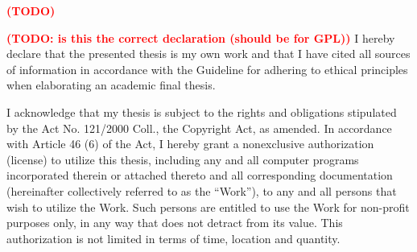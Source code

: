\documentclass[english,master,twoside]{ctufit-thesis}
\newcommand{\todo}[1]{\textbf{\textcolor{red}{(TODO: #1)}}}
\newcommand{\todoadd}[0]{\textbf{\textcolor{red}{(TODO)}}}
\begin{document}
\frontmatter\frontmatterinit %

\thispagestyle{empty}\maketitle\thispagestyle{empty}\cleardoublepage %



\imprintpage %
\stopTOCentries

\begin{acknowledgmentpage}
	\todoadd
\end{acknowledgmentpage}


\begin{declarationpage}
	\todo{is this the correct declaration (should be for GPL)}
	I hereby declare that the presented thesis is my own work and that I have cited all
	sources of information in accordance with the Guideline for adhering to ethical
	principles when elaborating an academic final thesis.

	I acknowledge that my thesis is subject to the rights and obligations stipulated by the
	Act No. 121/2000 Coll., the Copyright Act, as amended. In accordance with Article 46 (6)
	of the Act, I hereby grant a nonexclusive authorization (license) to utilize this thesis,
	including any and all computer programs incorporated therein or attached thereto and
	all corresponding documentation (hereinafter collectively referred to as the “Work”), to
	any and all persons that wish to utilize the Work. Such persons are entitled to use the
	Work for non-profit purposes only, in any way that does not detract from its value. This
	authorization is not limited in terms of time, location and quantity.
\end{declarationpage}

\printabstractpage

\tableofcontents

\listoffigures
\begingroup
\let\clearpage\relax
\listoftables
\thectufitlistingscommand
\endgroup
\end{document}
